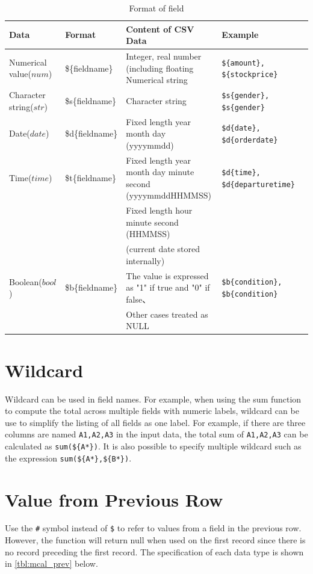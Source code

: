 \begin{table}[!hb]
\begin{center}
\caption{Format of field\label{tbl:mcal_fld}}
{\small
  \begin{tabular}{l|l|p{5cm}l|l} \hline
Data&Format&Content of CSV Data&Example\\ \hline
Numerical value($num$)   & \$\{fieldname\}  & Integer, real number (including floating Numerical string            & \verb|${amount}, ${stockprice}|\\
Character string($str$) & \$s\{fieldname\} & Character string                                           & \verb|$s{gender}, $s{gender}|\\
Date($date$)  & \$d\{fieldname\} & Fixed length year month day (yyyymmdd)                           & \verb|$d{date}, $d{orderdate}| \\
Time($time$)  & \$t\{fieldname\} & Fixed length year month day minute second (yyyymmddHHMMSS)             & \verb|$d{time}, $d{departuretime}| \\
              &               & Fixed length hour minute second (HHMMSS)                           &\\
              &               & (current date stored internally)                 &\\
Boolean($bool$)  & \$b\{fieldname\} & The value is expressed as "1" if true and "0"  if false、& \verb|$b{condition}, $b{condition}| \\
              &               & Other cases treated as NULL               & \\

\hline
  \end{tabular}
  }
  \end{center}
\end{table}

\section{Wildcard}
Wildcard can be used in field names. For example, when using the sum function to compute the total across multiple fields with numeric labels, wildcard can be use to simplify the listing of all fields as one label. For example, if there are three columns are named \verb|A1,A2,A3| in the input data, the total sum of \verb|A1,A2,A3| can be calculated as \verb|sum(${A*})|. It is also possible to specify multiple wildcard such as the expression \verb|sum(${A*},${B*})|. 


\section{Value from Previous Row }
Use the \verb|#| symbol instead of \verb|$| to refer to values from a field in the previous row. However, the function will return null when used on the first record since there is no record preceding the first record. The specification of each data type is shown in \ref{tbl:mcal_prev} below.  


